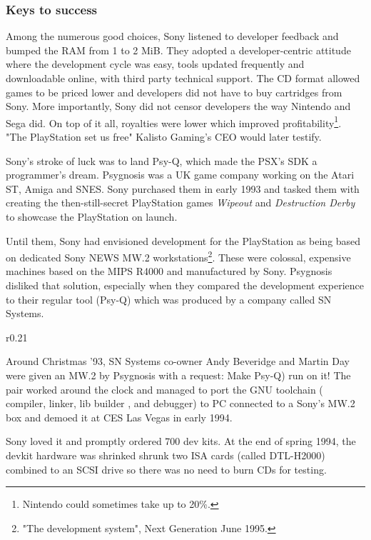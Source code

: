
\vspace{-10pt}
\subsubsection{Keys to success}
\par
 Among the numerous good choices, Sony listened to developer feedback and bumped the RAM from 1 to 2 MiB. They adopted a developer-centric attitude where the development cycle was easy, tools updated frequently and downloadable online, with third party technical support. The CD format allowed games to be priced lower and developers did not have to buy cartridges from Sony. More importantly, Sony did not censor developers the way Nintendo and Sega did. On top of it all, royalties were lower which improved profitability\footnote{Nintendo could sometimes take up to 20\%.}. "The PlayStation set us free" Kalisto Gaming's CEO would later testify.\\
\par
Sony's stroke of luck was to land Psy-Q, which made the PSX's SDK a programmer's dream. Psygnosis was a UK game company working on the Atari ST, Amiga and SNES. Sony purchased them in early 1993 and tasked them with creating the then-still-secret PlayStation games \textit{Wipeout} and \textit{Destruction Derby} to showcase the PlayStation on launch.\\
\par
Until them, Sony had envisioned development for the PlayStation as being based on dedicated Sony NEWS MW.2 workstations\footnote{"The development system", Next Generation June 1995.}. These were colossal, expensive machines based on the MIPS R4000 and manufactured by Sony. Psygnosis disliked that solution, especially when they compared the development experience to their regular tool (Psy-Q) which was produced by a company called SN Systems.\\
\par
\begin{wrapfigure}[10]{r}{0.21\textwidth}{
\centering {}}
\end{wrapfigure}
Around Christmas '93, SN Systems co-owner Andy Beveridge and Martin Day were given an MW.2 by Psygnosis with a request: Make Psy-Q) run on it! The pair worked around the clock and managed to port the GNU toolchain ( compiler,  linker, lib builder , and  debugger) to PC connected to a Sony's MW.2 box and demoed it at CES Las Vegas in early 1994.\\
\par
 Sony loved it and promptly ordered 700 dev kits. At the end of spring 1994, the devkit hardware was shrinked shrunk two ISA cards (called DTL-H2000) combined to an SCSI drive so there was no need to burn CDs for testing.\\

